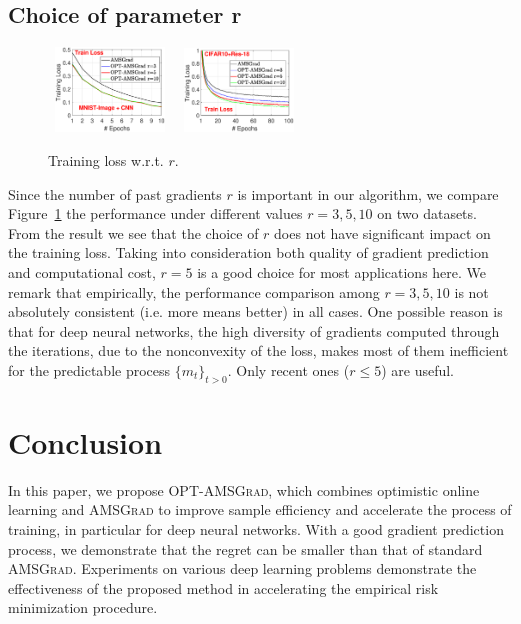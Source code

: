 \documentclass[11pt]{article}
\theoremstyle{k}
\begin{document}
\subsection{Choice of parameter r}\label{sec:choicer}
\begin{figure}\vspace{-0.3in}
\begin{center}
\mbox{
\includegraphics[width=1.15in]{new_figure/new_mnist_img_figure/mnist_img_train_loss_r3510_2.eps}\vspace{-0.5in}
}
\mbox{
\includegraphics[width=1.15in]{new_figure/cifar10_train_loss_r3510.eps}
}
\end{center}\vspace{-0.1in}
\caption{Training loss w.r.t. $r$.}\label{fig:compare}
\end{figure}
\vspace{-0.1in}
Since the number of past gradients $r$ is important in our algorithm, we compare Figure~\ref{fig:compare} the performance under different values $r=3,5,10$ on two datasets. 
From the result we see that the choice of $r$ does not have significant impact on the training loss.
Taking into consideration both quality of gradient prediction and computational cost, $r=5$ is a good choice for most applications here. 
We remark that empirically, the performance comparison among $r=3,5,10$ is not absolutely consistent (i.e. more means better) in all cases. 
One possible reason is that for deep neural networks, the high diversity of gradients computed through the iterations, due to the nonconvexity of the loss, makes most of them inefficient for the predictable process $\{m_t\}_{t>0}$. Only recent ones ($r \leq 5$) are useful.\vspace{-0.1in}
\section{Conclusion}
In this paper, we propose \textsc{OPT-AMSGrad}, which combines optimistic online learning and \textsc{AMSGrad} to improve sample efficiency and
accelerate the process of training, in particular for deep neural networks. 
With a good gradient prediction process, we demonstrate that the regret can be smaller than that of standard \textsc{AMSGrad}.
Experiments on various deep learning problems demonstrate the effectiveness of the proposed method in accelerating the empirical risk minimization procedure. 
\end{document}
